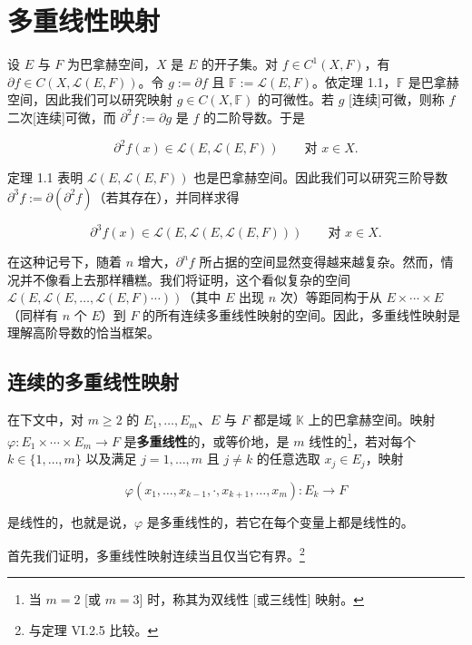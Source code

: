 \section{多重线性映射}

设 $ E $ 与 $ F $ 为巴拿赫空间，$ X $ 是 $ E $ 的开子集。对 $ f \in C^1(X, F) $，有 $ \partial f \in C(X, \mathcal{L}(E, F)) $。令 $ g := \partial f $ 且 $ \mathbb{F} := \mathcal{L}(E, F) $。依定理 1.1，$ \mathbb{F} $ 是巴拿赫空间，因此我们可以研究映射 $ g \in C(X, \mathbb{F}) $ 的可微性。若 $ g $ [连续]可微，则称 $ f $ 二次[连续]可微，而 $ \partial^2 f := \partial g $ 是 $ f $ 的二阶导数。于是

\[
\partial^2 f(x) \in \mathcal{L}(E, \mathcal{L}(E, F)) \qquad \text{对 } x \in X .
\]

定理 1.1 表明 $ \mathcal{L}(E, \mathcal{L}(E, F)) $ 也是巴拿赫空间。因此我们可以研究三阶导数 $ \partial^3 f := \partial(\partial^2 f) $（若其存在），并同样求得

\[
\partial^3 f(x) \in \mathcal{L}(E, \mathcal{L}(E, \mathcal{L}(E, F))) \qquad \text{对 } x \in X .
\]

在这种记号下，随着 $ n $ 增大，$ \partial^n f $ 所占据的空间显然变得越来越复杂。然而，情况并不像看上去那样糟糕。我们将证明，这个看似复杂的空间 $ \mathcal{L}(E, \mathcal{L}(E, \ldots, \mathcal{L}(E, F) \cdots)) $（其中 $ E $ 出现 $ n $ 次）等距同构于从 $ E \times \cdots \times E $（同样有 $ n $ 个 $ E $）到 $ F $ 的所有连续多重线性映射的空间。因此，多重线性映射是理解高阶导数的恰当框架。

\subsection*{连续的多重线性映射}

在下文中，对 $ m \ge 2 $ 的 $ E_1, \ldots, E_m $、$ E $ 与 $ F $ 都是域 $ \mathbb{K} $ 上的巴拿赫空间。映射 $ \varphi : E_1 \times \cdots \times E_m \to F $ 是\textbf{多重线性}的，或等价地，是 $ m $ 线性的\footnote{当 $ m = 2 $ [或 $ m = 3 $] 时，称其为双线性 [或三线性] 映射。}，若对每个 $ k \in \{1, \ldots, m\} $ 以及满足 $ j = 1, \ldots, m $ 且 $ j \ne k $ 的任意选取 $ x_j \in E_j $，映射

\[
\varphi(x_1, \ldots, x_{k-1}, \cdot, x_{k+1}, \ldots, x_m) : E_k \to F
\]

是线性的，也就是说，$ \varphi $ 是多重线性的，若它在每个变量上都是线性的。

首先我们证明，多重线性映射连续当且仅当它有界。\footnote{与定理 VI.2.5 比较。}

